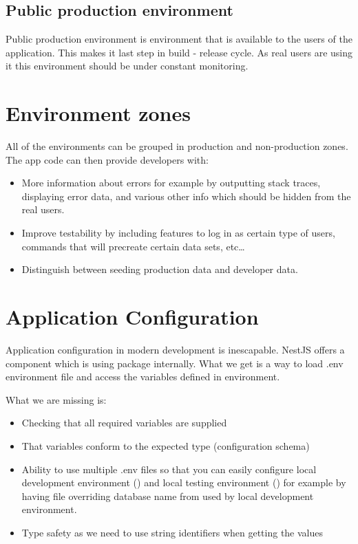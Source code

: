     \subsection{Public production environment}\label{subsec:public-production-environment}
    Public production environment  is environment that is available to the users of the application.
    This makes it last step in build - release cycle.
    As real users are using it this environment should be under constant monitoring.

    \section{Environment zones}\label{sec:environment-zones}
    All of the environments can be grouped in production and non-production zones.
    The app code can then provide developers with:
    \begin{itemize}
        \item More information about errors for example by outputting stack traces, displaying error data,
        and various other info which should be hidden from the real users.
        \item Improve testability by including features to log in as certain type of users, commands that will
        precreate certain data sets, etc\dots
        \item Distinguish between seeding production data and developer data.
    \end{itemize}


    \section{Application Configuration}\label{sec:application-configuration}

    Application configuration in modern development is inescapable.
    NestJS offers a component  which is using  package internally.
    What we get is a way to load .env environment file and access the variables defined in environment.

    What we are missing is:
    \begin{itemize}
        \item Checking that all required variables are supplied
        \item That variables conform to the expected type (configuration schema)
        \item Ability to use multiple .env files so that you can easily configure local development environment ()
        and local testing environment () for example by having  file overriding database name
        from  used by local development environment.
        \item Type safety as we need to use string identifiers when getting the values
    \end{itemize}

